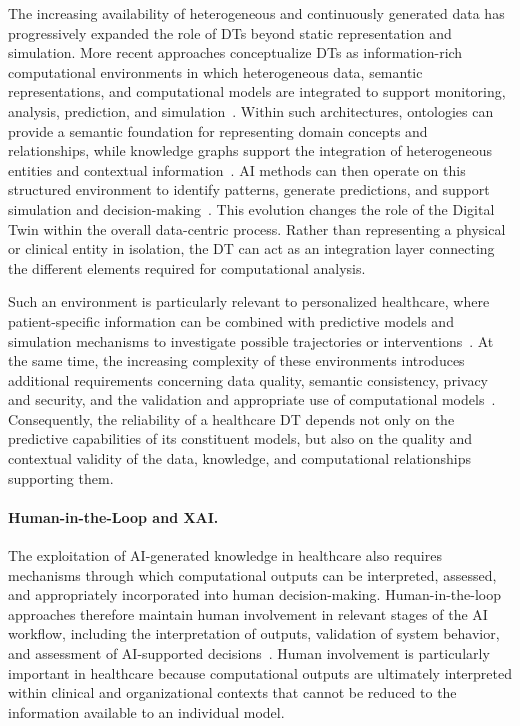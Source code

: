 The increasing availability of heterogeneous and continuously generated data has progressively expanded the role of DTs beyond static representation and simulation. More recent approaches conceptualize DTs as information-rich computational environments in which heterogeneous data, semantic representations, and computational models are integrated to support monitoring, analysis, prediction, and simulation~\cite{felicetti_knowledge_2025,Katsoulakis2024}. Within such architectures, ontologies can provide a semantic foundation for representing domain concepts and relationships, while knowledge graphs support the integration of heterogeneous entities and contextual information~\cite{boje_towards_2020,albers_semantic_2020}. AI methods can then operate on this structured environment to identify patterns, generate predictions, and support simulation and decision-making~\cite{felicetti_knowledge_2025}. This evolution changes the role of the Digital Twin within the overall data-centric process. Rather than representing a physical or clinical entity in isolation, the DT can act as an integration layer connecting the different elements required for computational analysis.

Such an environment is particularly relevant to personalized healthcare, where patient-specific information can be combined with predictive models and simulation mechanisms to investigate possible trajectories or interventions~\cite{Katsoulakis2024}. At the same time, the increasing complexity of these environments introduces additional requirements concerning data quality, semantic consistency, privacy and security, and the validation and appropriate use of computational models~\cite{Katsoulakis2024}. Consequently, the reliability of a healthcare DT depends not only on the predictive capabilities of its constituent models, but also on the quality and contextual validity of the data, knowledge, and computational relationships supporting them.

\paragraph{Human-in-the-Loop and XAI.}

The exploitation of AI-generated knowledge in healthcare also requires mechanisms through which computational outputs can be interpreted, assessed, and appropriately incorporated into human decision-making. Human-in-the-loop approaches therefore maintain human involvement in relevant stages of the AI workflow, including the interpretation of outputs, validation of system behavior, and assessment of AI-supported decisions~\cite{kaur_trustworthy_2022,felicetti_knowledge_2025}. Human involvement is particularly important in healthcare because computational outputs are ultimately interpreted within clinical and organizational contexts that cannot be reduced to the information available to an individual model.

